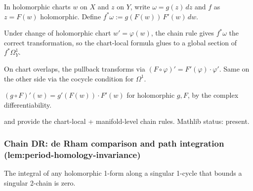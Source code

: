 \begin{lemma}
\label{lem:pbf-r1}
In holomorphic charts $w$ on $X$ and $z$ on $Y$, write $\omega = g(z)\,dz$ and $f$ as $z = F(w)$ holomorphic.  Define $f^{*}\omega := g(F(w))\,F'(w)\,dw$.
\leanok
\end{lemma}

\begin{lemma}
\label{lem:pbf-r2}
Under change of holomorphic chart $w' = \varphi(w)$, the chain rule gives $f^{*}\omega$ the correct transformation, so the chart-local formula glues to a global section of $f^{*}\Omega^{1}_{Y}$.
\leanok
\end{lemma}

\begin{lemma}
\label{lem:pbf-r3}
On chart overlaps, the pullback transforms via $(F \circ \varphi)' = F'(\varphi)\cdot\varphi'$.  Same on the other side via the cocycle condition for $\Omega^{1}$.
\leanok
\end{lemma}

\begin{lemma}
\label{lem:pbf-r4}
$(g \circ F)'(w) = g'(F(w)) \cdot F'(w)$ for holomorphic $g, F$, by the complex differentiability.
\leanok
\end{lemma}

\begin{lemma}
\label{lem:pbf-r5}
 and  provide the chart-local + manifold-level chain rules.  Mathlib status: present.
\leanok\mathlibok
\end{lemma}

\subsubsection*{Chain DR: de Rham comparison and path integration (lem:period-homology-invariance)}

\begin{lemma}
\label{lem:stokes-gap-integration-kills-boundary}
The integral of any holomorphic 1-form along a singular 1-cycle that bounds a singular 2-chain is zero.
\leanok
\end{lemma}

